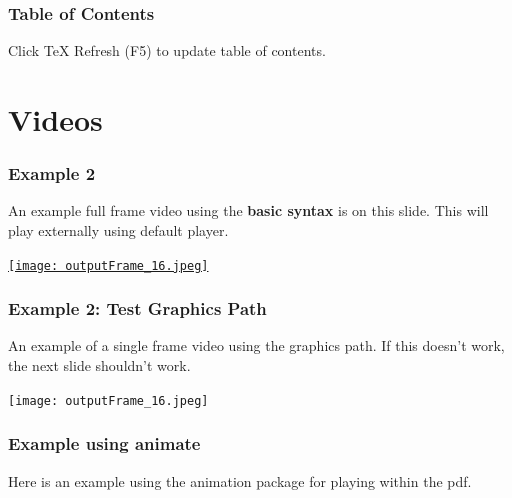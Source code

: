 \documentclass{beamer}
\begin{document}

% 
% 
% 


\begin{frame}
  \frametitle{Table of Contents}
  \tableofcontents
  Click TeX Refresh (F5) to update table of contents.
\end{frame}

\section{Videos}

\begin{frame}
    \frametitle{Example 2}
    
    An example full frame video using the \textbf{basic syntax} is on this slide. This will play externally using default player.
    
    \vspace{20pt}
    
    \href{run:apollo17.avi}{\texttt{[image: outputFrame\_16.jpeg]}}
\end{frame}

\begin{frame}
    \frametitle{Example 2: Test Graphics Path}
    
    An example of a single frame video using the graphics path.
    If this doesn't work, the next slide shouldn't work.
    
    \vspace{20pt}
    
    \texttt{[image: outputFrame\_16.jpeg]}
\end{frame}



\begin{frame}

\frametitle{Example using animate}
Here is an example using the animation package for playing within the pdf.
\begin{figure}
\end{figure}
\end{frame}


%     
% 
%     
% 
% 
%     
% 
% 
%     
\end{document}
